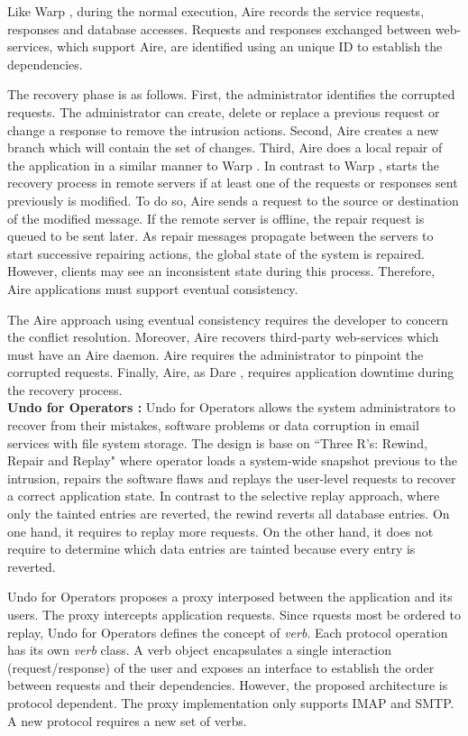 Like Warp \cite{warp}, during the normal execution, Aire records the service requests, responses and database accesses. Requests and responses exchanged between web-services, which support Aire, are identified using an unique ID to establish the dependencies.


The recovery phase is as follows. First, the administrator identifies the corrupted requests. The administrator can create, delete or replace a previous request or change a response to remove the intrusion actions. Second, Aire creates a new branch which will contain the set of changes. Third, Aire does a local repair of the application in a similar manner to Warp \cite{warp}. In contrast to Warp \cite{warp}, starts the recovery process in remote servers if at least one of the requests or responses sent previously is modified. To do so, Aire sends a request to the source or destination of the modified message. If the remote server is offline, the repair request is queued to be sent later. As repair messages propagate between the servers to start successive repairing actions, the global state of the system is repaired. However, clients may see an inconsistent state during this process. Therefore, Aire applications must support eventual consistency.  

The Aire approach using eventual consistency requires the developer to concern the conflict resolution. Moreover, Aire recovers third-party web-services which must have an Aire daemon. Aire requires the administrator to pinpoint the corrupted requests. Finally, Aire, as Dare \cite{dare}, requires application downtime during the recovery process.\\



\textbf{Undo for Operators \cite{undoForOperators}: }Undo for Operators allows the system administrators to recover from their mistakes, software problems or data corruption in email services with file system storage. The design is base on ``Three R's: Rewind, Repair and Replay" \cite{Brownc} where operator loads a system-wide snapshot previous to the intrusion, repairs the software flaws and replays the user-level requests to recover a correct application state. In contrast to the selective replay approach, where only the tainted entries are reverted, the rewind reverts all database entries. On one hand, it requires to replay more requests. On the other hand, it does not require to determine which data entries are tainted because every entry is reverted.

Undo for Operators proposes a proxy interposed between the application and its users. The proxy intercepts application requests. Since rquests most be ordered to replay, Undo for Operators defines the concept of \textit{verb}. Each protocol operation has its own \textit{verb} class. A verb object encapsulates a single interaction (request/response) of the user and exposes an interface to establish the order between requests and their dependencies. However, the proposed architecture is protocol dependent. The proxy implementation only supports IMAP and SMTP. A new protocol requires a new set of verbs. 

